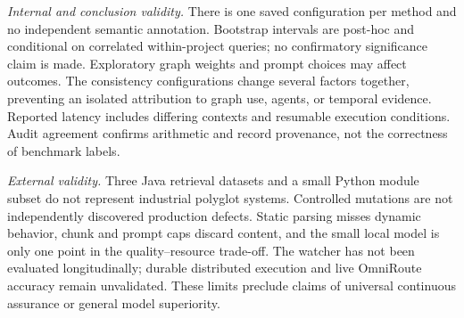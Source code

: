 \documentclass[conference,letterpaper,10pt]{IEEEtran}
\begin{document}
\textit{Internal and conclusion validity.} There is one saved configuration per method and no independent semantic annotation. Bootstrap intervals are post-hoc and conditional on correlated within-project queries; no confirmatory significance claim is made. Exploratory graph weights and prompt choices may affect outcomes. The consistency configurations change several factors together, preventing an isolated attribution to graph use, agents, or temporal evidence. Reported latency includes differing contexts and resumable execution conditions. Audit agreement confirms arithmetic and record provenance, not the correctness of benchmark labels.

\textit{External validity.} Three Java retrieval datasets and a small Python module subset do not represent industrial polyglot systems. Controlled mutations are not independently discovered production defects. Static parsing misses dynamic behavior, chunk and prompt caps discard content, and the small local model is only one point in the quality--resource trade-off. The watcher has not been evaluated longitudinally; durable distributed execution and live OmniRoute accuracy remain unvalidated. These limits preclude claims of universal continuous assurance or general model superiority.
\end{document}
